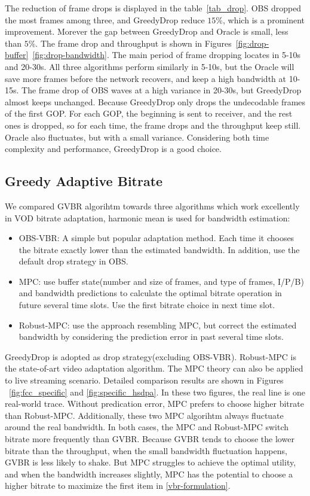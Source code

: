 

The reduction of frame drops is displayed in the table~\ref{tab_drop}. OBS dropped the most frames among three, and GreedyDrop reduce $15\%$, which is a prominent improvement. Morever the gap between GreedyDrop and Oracle is small, less than $5\%$. The frame drop and throughput is shown in Figures~\ref{fig:drop-buffer}~\ref{fig:drop-bandwidth}. The main period of frame dropping locates in 5-10s and 20-30s. All three algorithms perform similarly in 5-10s, but the Oracle will save more frames before the network recovers, and keep a high bandwidth at 10-15s. The frame drop of OBS waves at a high variance in 20-30s, but GreedyDrop almost keeps unchanged. Because GreedyDrop only drops the undecodable frames of the first GOP. For each GOP, the beginning is sent to receiver, and the rest ones is dropped, so for each time, the frame drops and the throughput keep still. Oracle also fluctuates, but with a small variance. Considering both time complexity and performance, GreedyDrop is a good choice.


\subsection{Greedy Adaptive Bitrate}

We compared GVBR algorihtm towards three algorithms which work excellently in VOD bitrate adaptation, harmonic mean is used for bandwidth estimation:
\begin{itemize}
  \item OBS-VBR: A simple but popular adaptation method. Each time it chooses the bitrate exactly lower than the estimated bandwidth. In addition, use the default drop strategy in OBS.
  \item MPC: use buffer state(number and size of frames, and type of frames, I/P/B) and bandwidth predictions to calculate the optimal bitrate operation in future several time slots. Use the first bitrate choice in next time slot.
  \item Robust-MPC: use the approach resembling MPC, but correct the estimated bandwidth by considering the prediction error in past several time slots.
\end{itemize}
GreedyDrop is adopted as drop strategy(excluding OBS-VBR). Robust-MPC is the state-of-art video adaptation algorithm. The MPC theory can also be applied to live streaming scenario.
Detailed comparison results are shown in Figures ~\ref{fig:fcc_specific} and \ref{fig:specific_hsdpa}. In these two figures, the real line is one real-world trace. Without predication error, MPC prefers to choose higher bitrate than Robust-MPC. Additionally, these two MPC algorihtm always fluctuate around the real bandwidth. In both cases, the MPC and Robust-MPC switch bitrate more frequently than GVBR. Because GVBR tends to choose the lower bitrate than the throughput, when the small bandwidth fluctuation happens, GVBR is less likely to shake. But MPC struggles to achieve the optimal utility, and when the bandwidth increases slightly, MPC has the potential to choose a higher bitrate to maximize the first item in \ref{vbr-formulation}.

